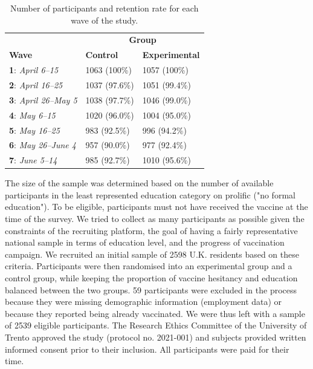 \documentclass[authordate, empirical]{jote-new-article}
\begin{document}
\begin{table}
  \begin{fullwidth}
    \caption{Number of participants and retention rate for each wave of the study.}
    \begin{tabularx}{\linewidth}{@{} X X X @{}}
                                           & \multicolumn{2}{c}{\textbf{Group}}                         \\
      \textbf{Wave}                        & \textbf{Control}                   & \textbf{Experimental} \\
      \hline \textbf{1}: \emph{April 6–15} & 1063 (100\%)                       & 1057 (100\%)          \\

      \textbf{2}: \emph{April 16–25}       & 1037 (97.6\%)                      & 1051 (99.4\%)         \\

      \textbf{3}: \emph{April 26–May 5}    & 1038 (97.7\%)                      & 1046 (99.0\%)         \\

      \textbf{4}: \emph{May 6–15}          & 1020 (96.0\%)                      & 1004 (95.0\%)         \\

      \textbf{5}: \emph{May 16–25}         & 983 (92.5\%)                       & 996 (94.2\%)          \\

      \textbf{6}: \emph{May 26–June 4}     & 957 (90.0\%)                       & 977 (92.4\%)          \\

      \textbf{7}: \emph{June 5–14}         & 985 (92.7\%)                       & 1010 (95.6\%)         \\
    \end{tabularx}
  \end{fullwidth}
\end{table}

The size of the sample was determined based on the number of available participants in the least represented education category on prolific ("no formal education"). To be eligible, participants must not have received the vaccine at the time of the survey. We tried to collect as many participants as possible given the constraints of the recruiting platform, the goal of having a fairly representative national sample in terms of education level, and the progress of vaccination campaign. We recruited an initial sample of 2598 U.K. residents based on these criteria. Participants were then randomised into an experimental group and a control group, while keeping the proportion of vaccine hesitancy and education balanced between the two groups. 59 participants were excluded in the process because they were missing demographic information (employment data) or because they reported being already vaccinated. We were thus left with a sample of 2539 eligible participants. The Research Ethics Committee of the University of Trento approved the study (protocol no. 2021-001) and subjects provided written informed consent prior to their inclusion. All participants were paid for their time.
\end{document}
